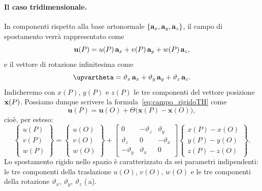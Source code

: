 \paragraph{Il caso tridimensionale.}
In componenti rispetto alla base ortonormale
$\{\mathbf{a}_x,\mathbf{a}_y,\mathbf{a}_z\}$,  il campo di spostamento verrà rappresentato come
\begin{equation}
	\mathbf{u}(P)=u(P)\,\mathbf{a}_x+v(P)\,\mathbf{a}_y+w(P)\,\mathbf{a}_z,
\end{equation}
e il vettore di rotazione infinitesima come
\begin{equation}
	\bm\upvartheta=\vartheta_x\,\ab_x+\vartheta_y\,\ab_y+\vartheta_z\,\ab_z.
\end{equation}
Indicheremo con $x(P)$, $y(P)$ e $z(P)$ le tre componenti del vettore posizione $\mathbf{x}(P)$.
Possiamo dunque scrivere la formula~\eqref{eq:campo_rigidoTH} come
\begin{equation}\label{eq:FFCI_matrice}
	\bm{u}(P) = \bm{u}(O)
	+ \bm{\varTheta}\bigl(\bm{x}(P) - \bm{x}(O)\bigr),
\end{equation}
cioè, per esteso:
\begin{equation}\label{eq:FFCI_estesa}
	\begin{Bmatrix} u(P) \\ v(P) \\ w(P) \end{Bmatrix}
	= \begin{Bmatrix} u(O) \\ v(O) \\ w(O) \end{Bmatrix}
	+ \begin{bmatrix}
		0 & -\vartheta_z & \vartheta_y \\
		\vartheta_z & 0 & -\vartheta_x \\
		-\vartheta_y & \vartheta_x & 0
	\end{bmatrix}
	\begin{Bmatrix}
		x(P)-x(O) \\ y(P)-y(O) \\ z(P)-z(O)
	\end{Bmatrix}.
\end{equation}
Lo spostamento rigido nello spazio è caratterizzato da sei
parametri indipendenti: le tre componenti della traslazione
$u(O)$, $v(O)$, $w(O)$ e le tre componenti della rotazione
$\vartheta_x$, $\vartheta_y$, $\vartheta_z$ (\,a). 

